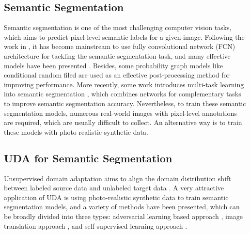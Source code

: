 \documentclass[sigconf]{acmart}
\begin{document}
\subsection{Semantic Segmentation}
\par Semantic segmentation is one of the most challenging computer vision tasks, which aims to predict pixel-level semantic labels for a given image. Following the work in \cite{long2015fully}, it has become mainstream to use fully convolutional network (FCN) architecture for tackling the semantic segmentation task, and many effective models have been presented \cite{wang2016objectness,badrinarayanan2017segnet,chen2017deeplab,zhao2017pyramid,xu2020march,gu2020context,liu2020dynamic}. Besides, some probability graph models like conditional random filed \cite{koltun2011efficient} are used as an effective post-processing method for improving performance. More recently, some work introduces multi-task learning into semantic segmentation \cite{dai2016instance,chen2016semantic,kokkinos2017ubernet,takikawa2019gated}, which combines networks for complementary tasks to improve semantic segmentation accuracy. Nevertheless, to train these semantic segmentation models, numerous real-world images with pixel-level annotations are required, which are usually difficult to collect. An alternative way is to train these models with photo-realistic synthetic data.

\subsection{UDA for Semantic Segmentation}
\par Unsupervised domain adaptation aims to align the domain distribution shift between labeled source data and unlabeled target data \cite{zou2020unsupervised,zhuo2017deep,li2019joint,jiang2020resource,chen2020dsdanet}. A very attractive application of UDA is using photo-realistic synthetic data to train semantic segmentation models, and a variety of methods have been presented, which can be broadly divided into three types: adversarial learning based approach \cite{hoffman2016fcns,tsai2018learning,tsai2019domain,vu2019advent,li2019bidirectional, kim2020learning,wang2020classes}, image translation approach \cite{hoffman2018cycada,zhang2018fully,li2019bidirectional,choi2019self,yang2020fda}, and self-supervised learning approach \cite{xu2019self, choi2019self,song2020learning,zou2018unsupervised,zhang2019curriculum,lian2019constructing}. 
\end{document}
